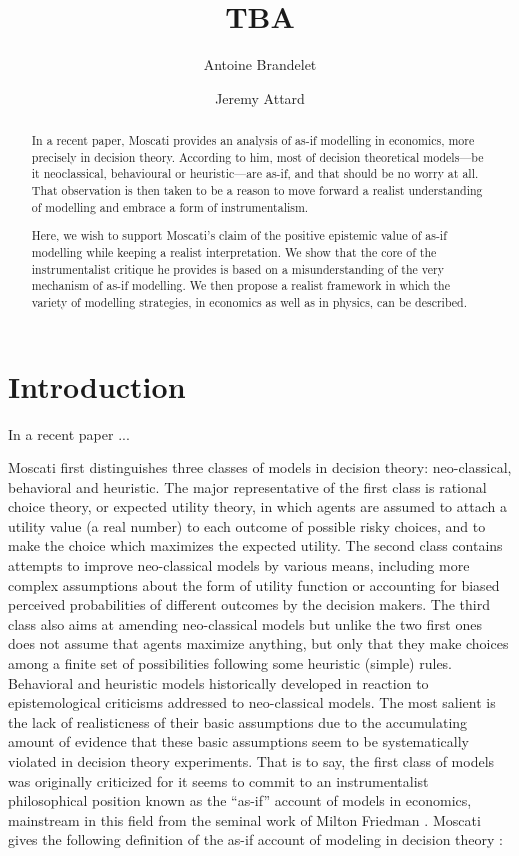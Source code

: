 \documentclass[a4paper,11pt]{article}
\title{TBA}
\date{}
\author[1]{Antoine Brandelet}
\author[1,2]{Jeremy Attard}
\affil[1]{Department of Philosophy and History of Science, University of Mons, Belgium}
\affil[2]{Department of Sciences, Philosophies and Societies, University of Namur, Belgium}
\begin{document}
\maketitle

\begin{abstract}
    In a recent paper, Moscati provides an analysis of as-if modelling in economics, more precisely in decision theory. According to him, most of decision theoretical models---be it neoclassical, behavioural or heuristic---are as-if, and that should be no worry at all. That observation is then taken to be a reason to move forward a realist understanding of modelling and embrace a form of instrumentalism.

    Here, we wish to support Moscati's claim of the positive epistemic value of as-if modelling while keeping a realist interpretation. We show that the core of the instrumentalist critique he provides is based on a misunderstanding of the very mechanism of as-if modelling. We then propose a realist framework in which the variety of modelling strategies, in economics as well as in physics, can be described.
\end{abstract}


\section{Introduction}
In a recent paper \citep{Moscati2023}... 

Moscati first distinguishes three classes of models in decision theory: neo-classical, behavioral and heuristic. The major representative of the first class is rational choice theory, or expected utility theory, in which agents are assumed to attach a utility value (a real number) to each outcome of possible risky choices, and to make the choice which maximizes the expected utility. The second class contains attempts to improve neo-classical models by various means, including more complex assumptions about the form of utility function or accounting for biased perceived probabilities of different outcomes by the decision makers. The third class also aims at amending neo-classical models but unlike the two first ones does not assume that agents maximize anything, but only that they make choices among a finite set of possibilities following some heuristic (simple) rules. Behavioral and heuristic models historically developed in reaction to epistemological criticisms addressed to neo-classical models. The most salient is the lack of realisticness of their basic assumptions due to the accumulating amount of evidence that these basic assumptions seem to be systematically violated in decision theory experiments. That is to say, the first class of models was originally criticized for it seems to commit to an instrumentalist philosophical position known as the ``as-if'' account of models in economics, mainstream in this field from the seminal work of Milton Friedman \cite{Friedman1953}. Moscati gives the following definition of the as-if account of modeling in decision theory \citep[p. 2]{Moscati2023}: 
\end{document}
